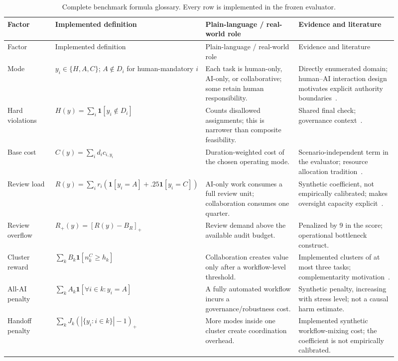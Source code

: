 \begingroup
\small
\setlength{\tabcolsep}{3pt}
\begin{longtable}{@{}p{0.13\linewidth}p{0.25\linewidth}p{0.25\linewidth}p{0.28\linewidth}@{}}
\caption{Complete benchmark formula glossary. Every row is implemented in the frozen evaluator.}\label{tab:benchmarkglossary}\\
\toprule
Factor & Implemented definition & Plain-language / real-world role & Evidence and literature \\
\midrule
\endfirsthead
\toprule
Factor & Implemented definition & Plain-language / real-world role & Evidence and literature \\
\midrule
\endhead
Mode & $y_i\in\{H,A,C\}$; $A\notin D_i$ for human-mandatory $i$ & Each task is human-only, AI-only, or collaborative; some retain human responsibility. & Directly enumerated domain; human--AI interaction design motivates explicit authority boundaries~\citep{amershi2019humanai,seeber2020machines}. \\
Hard violations & $H(y)=\sum_i\mathbf1[y_i\notin D_i]$ & Counts disallowed assignments; this is narrower than composite feasibility. & Shared final check; governance context~\citep{nist2023airmf,iso42001}. \\
Base cost & $C(y)=\sum_i d_i c_{i,y_i}$ & Duration-weighted cost of the chosen operating mode. & Scenario-independent term in the evaluator; resource allocation tradition~\citep{gans2003callcenters}. \\
Review load & $R(y)=\sum_i r_i(\mathbf1[y_i=A]+.25\mathbf1[y_i=C])$ & AI-only work consumes a full review unit; collaboration consumes one quarter. & Synthetic coefficient, not empirically calibrated; makes oversight capacity explicit~\citep{nist2023airmf}. \\
Review overflow & $R_+(y)=[R(y)-B_R]_+$ & Review demand above the available audit budget. & Penalized by 9 in the score; operational bottleneck construct. \\
Cluster reward & $\sum_k B_k\mathbf1[n_k^C\ge h_k]$ & Collaboration creates value only after a workflow-level threshold. & Implemented clusters of at most three tasks; complementarity motivation~\citep{seeber2020machines,fuegener2026complementarity}. \\
All-AI penalty & $\sum_k A_k\mathbf1[\forall i\in k:y_i=A]$ & A fully automated workflow incurs a governance/robustness cost. & Synthetic penalty, increasing with stress level; not a causal harm estimate. \\
Handoff penalty & $\sum_k J_k(|\{y_i:i\in k\}|-1)_+$ & More modes inside one cluster create coordination overhead. & Implemented synthetic workflow-mixing cost; the coefficient is not empirically calibrated. \\

\end{longtable}
